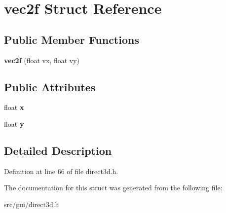 \hypertarget{structvec2f}{\section{vec2f Struct Reference}
\label{structvec2f}
}
\subsection*{Public Member Functions}
\begin{DoxyCompactItemize}
\item 
\hypertarget{structvec2f_a915600f7812e74f6836f2d563a785084}{{\bfseries vec2f} (float vx, float vy)}\label{structvec2f_a915600f7812e74f6836f2d563a785084}

\end{DoxyCompactItemize}
\subsection*{Public Attributes}
\begin{DoxyCompactItemize}
\item 
\hypertarget{structvec2f_a6b17e4442fdc15a98727c8002a9a1bac}{float {\bfseries x}}\label{structvec2f_a6b17e4442fdc15a98727c8002a9a1bac}

\item 
\hypertarget{structvec2f_ab10800546a1f4186877e2fe9a7488e74}{float {\bfseries y}}\label{structvec2f_ab10800546a1f4186877e2fe9a7488e74}

\end{DoxyCompactItemize}


\subsection{Detailed Description}


Definition at line 66 of file direct3d.\-h.



The documentation for this struct was generated from the following file\-:\begin{DoxyCompactItemize}
\item 
src/gui/direct3d.\-h\end{DoxyCompactItemize}
